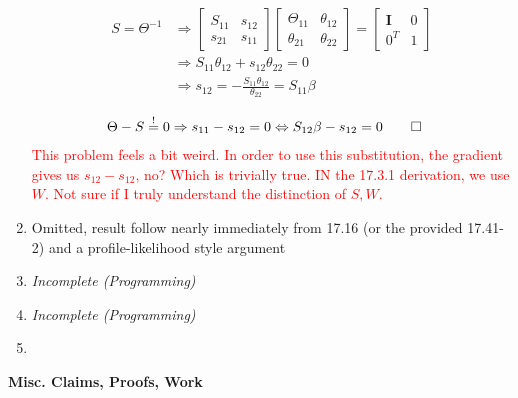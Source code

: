 \documentclass[11pt]{article}
\begin{document}
\begin{enumerate}
    \begin{align*}
    S 
    = 
    \Theta^{-1}
    &\Rightarrow 
    \begin{bmatrix}
        S_{11} & s_{12} \\ 
        s_{21} & s_{11}
    \end{bmatrix}
        \begin{bmatrix}
        \Theta_{11} & \theta_{12} \\ 
        \theta_{21} & \theta_{22}
    \end{bmatrix}
    =
    \begin{bmatrix}
        \mathbf{I} & 0 \\ 
        0^T & 1
    \end{bmatrix}
    \\
    &\Rightarrow 
    S_{11}\theta_{12} + s_{12}\theta_{22} = 0
    \\
    &\Rightarrow 
    s_{12} 
    = 
    -\frac{
    S_{11}\theta_{12}
    }{
    \theta_{22}
    }
    =
    S_{11}\beta 
    \end{align*}
    
    \begin{align*}
        \Theta - S \stackrel{!}{=}0
        &\Rightarrow
        s_{11} - s_{12} = 0
        \Leftrightarrow 
        S_{12}\beta - s_{12} = 0 \qed 
    \end{align*}
    \textcolor{red}{This problem feels a bit weird. In order to use this substitution, the gradient gives us $s_{12} - s_{12}$, no? Which is trivially true. IN the 17.3.1 derivation, we use $W$. Not sure if I truly understand the distinction of $S, W$. }

    \item Omitted, result follow nearly immediately from 17.16 (or the provided 17.41-2) and a profile-likelihood style argument

    \item {\it Incomplete (Programming)} 

    \item {\it Incomplete (Programming)}

    \item 
\end{enumerate}

\begin{tcolorbox}
    \vspace{4mm}
    \Large \bf Misc. Claims, Proofs, Work
    \vspace{4mm}
\end{tcolorbox}
\end{document}
